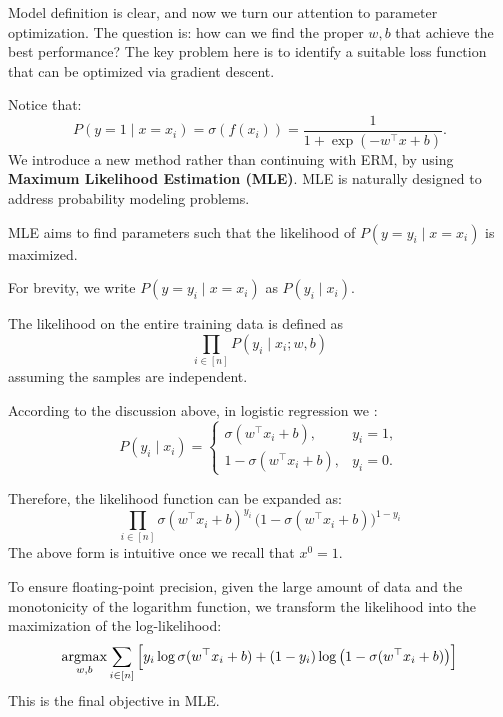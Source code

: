 \documentclass[../main]{subfiles}
\begin{document}
Model definition is clear, and now we turn our attention to parameter optimization. 
The question is: how can we find the proper $w, b$ that achieve the best performance? 
The key problem here is to identify a suitable loss function that can be optimized via gradient descent.

Notice that:
\begin{equation}
    P(y=1 \mid x = x_i) = \sigma(f(x_i)) = \frac{1}{1+\exp(-w^\top x + b)} .
\end{equation}
We introduce a new method rather than continuing with ERM, by using \textbf{Maximum Likelihood Estimation (MLE)}. 
MLE is naturally designed to address probability modeling problems.

\begin{definition}
    MLE aims to find parameters such that the likelihood of $P(y=y_i \mid x=x_i)$ is maximized.
\end{definition}

\begin{remark}
  For brevity, we write $P(y=y_i \mid x=x_i)$ as $P(y_i \mid x_i)$.
\end{remark}
\begin{definition}[Likelihood]
  The likelihood on the entire training data is defined as
  \begin{equation}
      \prod_{i \in [n]} P(y_i \mid x_i; w, b)
  \end{equation}
  assuming the samples are independent.
\end{definition}

According to the discussion above, in logistic regression we :
\begin{equation}
    P(y_i \mid x_i) =
    \begin{cases}
      \sigma(w^\top x_i + b), & y_i = 1, \\
      1 - \sigma(w^\top x_i + b), & y_i = 0.
    \end{cases}
\end{equation}

Therefore, the likelihood function can be expanded as:
\begin{equation}
  \prod_{i \in [n]} \sigma(w^\top x_i + b)^{y_i} \,
  \big(1 - \sigma(w^\top x_i + b)\big)^{1-y_i}
\end{equation}
The above form is intuitive once we recall that $x^0 = 1$.

To ensure floating-point precision, given the large amount of data and the monotonicity of the logarithm function, 
we transform the likelihood into the maximization of the log-likelihood:
\begin{equation}
    \mathop{\mathrm{argmax}}_{w,b} \sum_{i \in [n]} 
    \Big[ y_i \log \sigma(w^\top x_i + b) 
    + (1-y_i) \log \big(1 - \sigma(w^\top x_i + b)\big) \Big]
\end{equation}
This is the final objective in MLE.
\end{document}
